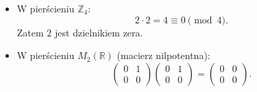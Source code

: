 \begin{eg}
	\begin{itemize}
		\item W pierścieniu $\mathbb{Z}_4$: \[2 \cdot 2 = 4 \equiv 0 \pmod 4.\] Zatem $2$ jest dzielnikiem zera.
		\item W pierścieniu $M_2(\mathbb{R})$ (macierz nilpotentna): \[\begin{pmatrix} 0 & 1 \\ 0 & 0 \end{pmatrix} \begin{pmatrix} 0 & 1 \\ 0 & 0 \end{pmatrix} = \begin{pmatrix} 0 & 0 \\ 0 & 0 \end{pmatrix}.\]
	\end{itemize}
\end{eg}

